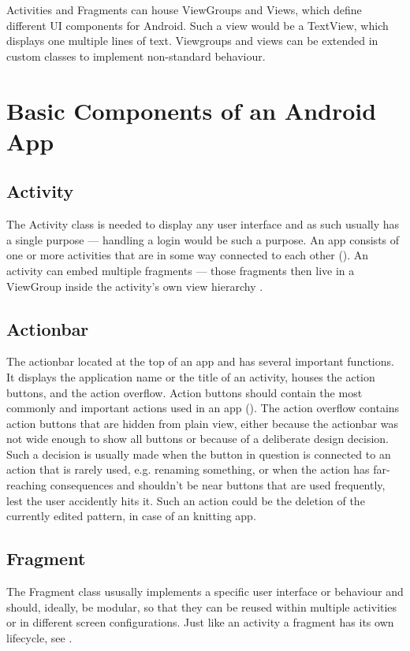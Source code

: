 Activities and Fragments can house ViewGroups and Views, which define different UI components for Android. Such a view would be a TextView, which displays one multiple lines of text. Viewgroups and views can be extended in custom classes to implement non-standard behaviour.

\section{Basic Components of an Android App}

\subsection{Activity}
The Activity class is needed to display any user interface and as such usually has a single purpose --- handling a login would be such a purpose. An app consists of one or more activities that are in some way connected to each other (\cite{activities_in_app}). An activity can embed multiple fragments --- those fragments then live in a ViewGroup inside the activity's own view hierarchy \cite{androidfragment}.  

\subsection{Actionbar}
The actionbar located at the top of an app and has several important functions. It displays the application name or the title of an activity, houses the action buttons, and the action overflow. Action buttons should contain the most commonly and important actions used in an app (\cite{actionbar}). The action overflow contains action buttons that are hidden from plain view, either because the actionbar was not wide enough to show all buttons or because of a deliberate design decision. Such a decision is usually made when the button in question is connected to an action that is rarely used, e.g. renaming something, or when the action has far-reaching consequences and shouldn't be near buttons that are used frequently, lest the user accidently hits it. Such an action could be the deletion of the currently edited pattern, in case of an knitting app. 

\subsection{Fragment}
The Fragment class ususally implements a specific user interface or behaviour and should, ideally, be modular, so that they can be reused within multiple activities or in different screen configurations. Just like an activity a fragment has its own lifecycle, see .

